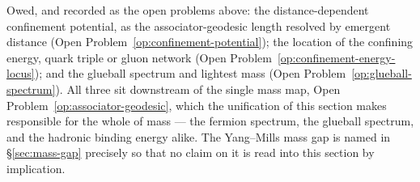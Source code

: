 Owed, and recorded as the open problems above: the distance-dependent confinement potential, as the
associator-geodesic length resolved by emergent distance (Open Problem~\ref{op:confinement-potential});
the location of the confining energy, quark triple or gluon network (Open
Problem~\ref{op:confinement-energy-locus}); and the glueball spectrum and lightest mass (Open
Problem~\ref{op:glueball-spectrum}). All three sit downstream of the single mass map, Open
Problem~\ref{op:associator-geodesic}, which the unification of this section makes responsible for the
whole of mass --- the fermion spectrum, the glueball spectrum, and the hadronic binding energy
alike. The Yang--Mills mass gap is named in \S\ref{sec:mass-gap} precisely so that no claim on it is
read into this section by implication.

